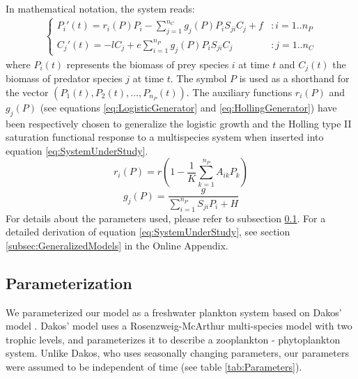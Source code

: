 In mathematical notation, the system reads:
%
\begin{eqnarray}
\label{eq:SystemUnderStudy}
	\begin{cases}
	P_i'(t) =  r_i(P) P_i  - \sum_{j = 1}^{n_C} g_j(P) P_i S_{ji} C_j + f & : i = 1..n_P
	\\
	C_j'(t) = - l C_j +  e \sum_{i = 1}^{n_P} g_j(P) P_i S_{ji} C_j  & : j = 1..n_C
	\end{cases}
\end{eqnarray}
%
where $P_i(t)$ represents the biomass of prey species $i$ at time $t$ and $C_j(t)$ the biomass of predator species $j$ at time $t$. The symbol $P$ is used as a shorthand for the vector $(P_1(t), P_2(t), ..., P_{n_P}(t))$. The auxiliary functions $r_i(P)$ and $g_j(P)$ (see equations \ref{eq:LogisticGenerator} and \ref{eq:HollingGenerator}) have been respectively chosen to generalize the logistic growth and the Holling type II saturation functional response \citep{Edelstein-Keshet} to a multispecies system when inserted into equation \ref{eq:SystemUnderStudy}.
%
\begin{equation}
\label{eq:LogisticGenerator}
	r_i(P) = r \left( 1 - \frac{1}{K} \sum_{k=1}^{n_P} A_{ik} P_k \right)
\end{equation}
%
\begin{equation}
\label{eq:HollingGenerator}
	g_j(P) = \frac{g}{\sum_{i=1}^{n_P} S_{ji} P_i + H}
\end{equation}
%
For details about the parameters used, please refer to subsection \ref{subsec:Parameterization}. For a detailed derivation of equation \ref{eq:SystemUnderStudy}, see section \ref{subsec:GeneralizedModels} in the Online Appendix.

\subsection{Parameterization}
\label{subsec:Parameterization}
We parameterized our model as a freshwater plankton system based on Dakos' model \citep{Dakos2009b}. Dakos' model uses a Rosenzweig-McArthur multi-species model with two trophic levels, and parameterizes it to describe a zooplankton - phytoplankton system. Unlike Dakos, who uses seasonally changing parameters, our parameters were assumed to be independent of time (see table \ref{tab:Parameters}).

